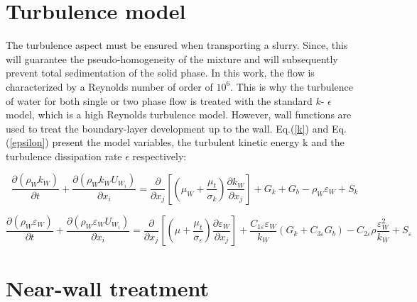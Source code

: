 \documentclass[11pt]{report}
\begin{document}
\section{Turbulence model }
%
The turbulence aspect must be ensured when transporting a slurry. 
%
Since, this will guarantee the pseudo-homogeneity of the mixture and will subsequently prevent total sedimentation of the solid phase. 
%
In this work, the flow is characterized by a Reynolds number of order of $10^6$. This is why the turbulence of water for both single or two phase flow is treated with the standard $k$- $\epsilon$ model, which is a high Reynolds turbulence model. 
%
However, wall functions are used to treat the boundary-layer development up to the wall. Eq.(\ref{k}) and Eq.(\ref{epsilon}) present the model variables, the turbulent kinetic energy k and the turbulence dissipation rate $\epsilon$ respectively:

\begin{equation}
\frac{\partial(\rho_W k_W)}{\partial t}+\frac{\partial\left(\rho_W k_W U_{W_i}\right)}{\partial x_{i}}=\frac{\partial}{\partial x_{j}}\left[\left(\mu_W+\frac{\mu_{t}}{\sigma_{k}}\right) \frac{\partial k_W}{\partial x_{j}}\right]+G_{k}+G_{b}-\rho_W \varepsilon_W+S_{k}
\label{k}
\end{equation}

\begin{equation}
\frac{\partial(\rho_W \varepsilon_W)}{\partial t}+\frac{\partial\left(\rho_W \varepsilon_W U_{W_i}\right)}{\partial x_{i}}=\frac{\partial}{\partial x_{j}}\left[\left(\mu+\frac{\mu_{t}}{\sigma_{\varepsilon}}\right) \frac{\partial \varepsilon_W}{\partial x_{j}}\right]+\frac{C_{1 \varepsilon} \varepsilon_W}{k_W}\left(G_{k}+C_{3 \varepsilon} G_{b}\right)-C_{2 \varepsilon} \rho \frac{\varepsilon_{W}^{2}}{k_W}+S_{\varepsilon}
\label{epsilon}
\end{equation}

\section{Near-wall treatment} \label{NWT}
\end{document}
